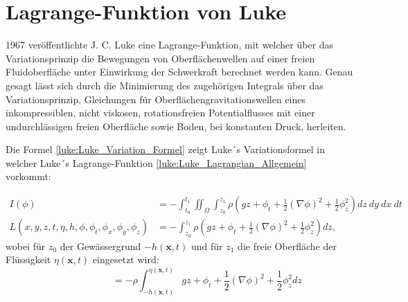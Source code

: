 %
%
%
%

\section{Lagrange-Funktion von Luke\label{luke:section:Luke_Lagrangian}}

1967 veröffentlichte J. C. Luke \cite{luke:Luke1967} eine Lagrange-Funktion, mit welcher über das Variationsprinzip die Bewegungen von Oberflächenwellen auf einer freien Fluidoberfläche unter Einwirkung der Schwerkraft berechnet werden kann.
Genau gesagt lässt sich durch die Minimierung des zugehörigen Integrals über das Variationsprinzip, Gleichungen für Oberflächengravitationswellen eines inkompressiblen, nicht viskosen, rotationsfreien Potentialflusses mit einer undurchlässigen freien Oberfläche sowie Boden, bei konstanten Druck, herleiten.

Die Formel \eqref{luke:Luke_Variation_Formel} zeigt Luke´s Variationsformel in welcher Luke´s Lagrange-Funktion \eqref{luke:Luke_Lagrangian_Allgemein} vorkommt:

\begin{align}
	I(\phi)
	&=
	- \int_{t_0}^{t_1} \iint_\Omega \int_{z_0}^{z_1}\rho\left(
	g z + \phi_t + \frac{1}{2}(\nabla\phi)^2 + \frac{1}{2}\phi_z^2
	\right) dz \ dy \ dx \ dt
	\label{luke:Luke_Variation_Formel}
	\\
	L(x,y,z,t,\eta,h,\phi,\phi_t,\phi_x, \phi_y, \phi_z)
	&=
	-\int_{z_0}^{z_1}\rho\left( g z + \phi_t + \frac{1}{2}(\nabla\phi)^2 + \frac{1}{2}\phi_z^2 \right) dz,
	\label{luke:Luke_Lagrangian_Allgemein}
\end{align}
wobei für $z_0$ der Gewässergrund $-h(\bm{x},t)$ und für $z_1$ die freie Oberfläche der Flüssigkeit $\eta(\bm{x},t)$ eingesetzt wird:
\[
\qquad\qquad\quad\;\;=
-\rho\int_{-h(\bm{x},t)}^{\eta(\bm{x},t)} 
g z + \phi_t + \frac{1}{2}(\nabla\phi)^2 + \frac{1}{2}\phi_z^2 dz
\]



